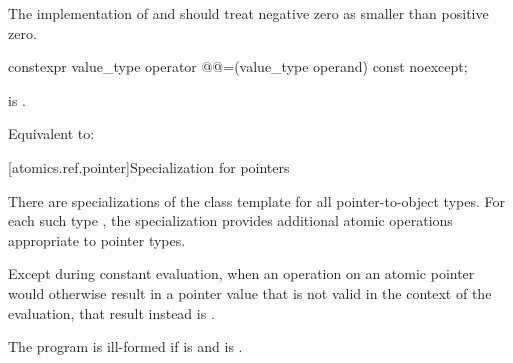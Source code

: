 \begin{itemdescr}
\pnum
\recommended
The implementation of  and 
should treat negative zero as smaller than positive zero.
\end{itemdescr}

%
%
\begin{itemdecl}
constexpr value_type operator @@=(value_type operand) const noexcept;
\end{itemdecl}

\begin{itemdescr}
\pnum
\constraints
{} is .

\pnum
\effects
Equivalent to:
\end{itemdescr}

[atomics.ref.pointer]{Specialization for pointers}
%

\pnum
There are specializations of the  class template
for all pointer-to-object types.
For each such type ,
the specialization  provides
additional atomic operations appropriate to pointer types.

\pnum
Except during constant evaluation,
when an operation on an atomic pointer
would otherwise result in a pointer value 
that is not valid in the context of the evaluation,
that result instead is
.

\pnum
The program is ill-formed
if  is  and
 is .

